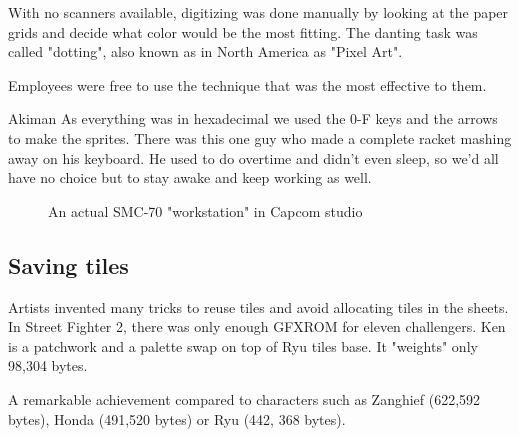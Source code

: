 With no scanners available, digitizing was done manually by looking at the paper grids and decide what color would be the most fitting. The danting task was called "dotting", also known as in North America as "Pixel Art". 

Employees were free to use the technique that was the most effective to them.


\begin{q}{Akiman\cite{ar20160404}}
  As everything was in hexadecimal we used the 0-F keys and the arrows to make the sprites. There was this one guy who made a complete racket mashing away on his keyboard. He used to do overtime and didn't even sleep, so we'd all have no choice but to stay awake and keep working as well.
\end{q}

 \begin{figure}[H]
\caption*{An actual SMC-70 "workstation" in Capcom studio}
\end{figure}









\subsection{Saving tiles}
Artists invented many tricks to reuse tiles and avoid allocating tiles in the sheets. In Street Fighter 2, there was only enough GFXROM for eleven challengers. Ken is a patchwork and a palette swap on top of Ryu tiles base. It "weights" only 98,304 bytes.

A remarkable achievement compared to characters such as Zanghief (622,592 bytes), Honda (491,520 bytes) or Ryu (442, 368 bytes). 

\begin{minipage}[t]{0.19\linewidth}
\end{minipage}%
\hfill%
\begin{minipage}[t]{0.19\linewidth}
\end{minipage}
\hfill%
\begin{minipage}[t]{0.19\linewidth}
\end{minipage}%
\hfill%
\begin{minipage}[t]{0.19\linewidth}
\end{minipage}
\hfill%
\begin{minipage}[t]{0.19\linewidth}
\end{minipage}

